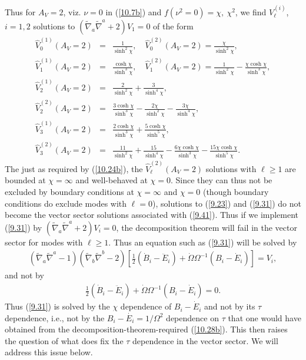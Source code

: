 Thus for $A_V=2$, viz. $\nu=0$  in (\ref{10.7b}) and $f(\nu^2=0)=\chi,~\chi^2$,  we find $V^{(i)}_{\ell}$, $i=1,2$ solutions to $(\tilde{\nabla}_a\tilde{\nabla}^a+2)V_1=0$ of the form 
%
\begin{eqnarray}
\hat{V}^{(1)}_0(A_V=2)&=&\frac{1}{ \sinh^2\chi},\quad \hat{V}^{(2)}_0(A_V=2)=\frac{\chi }{ \sinh^2\chi},
\nonumber\\
\hat{V}^{(1)}_1(A_V=2)&=&\frac{\cosh \chi }{ \sinh^3\chi},\quad \hat{V}^{(2)}_1(A_V=2)=\frac{1}{ \sinh^2\chi}-\frac{\chi\cosh\chi}{ \sinh^3\chi},
\nonumber\\
\hat{V}^{(1)}_2(A_V=2)&=&\frac{2}{ \sinh^2\chi}+\frac{3}{\sinh^4\chi},
\nonumber\\
\hat{V}^{(2)}_2(A_V=2)&=&\frac{3\cosh\chi}{\sinh^3\chi}-\frac{2\chi}{\sinh^2\chi}-\frac{3\chi }{\sinh^4\chi},
\nonumber\\
\hat{V}^{(1)}_3(A_V=2)&=&\frac{2\cosh\chi}{\sinh^3\chi}+\frac{5\cosh\chi}{\sinh^5\chi},
\nonumber\\
 \hat{V}^{(2)}_3(A_V=2)&=&\frac{11}{\sinh^2\chi}+\frac{15}{\sinh^4\chi}-\frac{6\chi\cosh\chi}{\sinh^3\chi}-\frac{15\chi\cosh\chi }{\sinh^5\chi}.~~~
\label{10.26b}
\end{eqnarray}
%
The just as required by (\ref{10.24b}), the $\hat{V}^{(2)}_{\ell}(A_V=2)$ solutions with $\ell \geq1$ are bounded at  $\chi=\infty$ and well-behaved at $\chi=0$. Since they can thus not be excluded by boundary conditions at $\chi=\infty$ and $\chi=0$ (though boundary conditions do exclude modes with $\ell=0$), solutions to (\ref{9.23}) and (\ref{9.31}) do not become the vector sector solutions associated with (\ref{9.41}). Thus if we implement (\ref{9.31}) by $(\tilde{\nabla}_a\tilde{\nabla}^a+2)V_i=0$, the  decomposition theorem will fail in the vector sector for modes with $\ell \geq 1$. Thus an equation such as (\ref{9.31}) 
will be solved by 
%
\begin{eqnarray}
(\tilde{\nabla}_a\tilde{\nabla}^a-1)(\tilde{\nabla}_b\tilde{\nabla}^b-2)\left[\tfrac{1}{2}(\dot{B}_i-\ddot{E}_i)+\dot{\Omega}\Omega^{-1}(B_i-\dot{E}_i)\right]=V_i,
\label{10.27b}
\end{eqnarray}
%
and not by
%
\begin{eqnarray}
\tfrac{1}{2}(\dot{B}_i-\ddot{E}_i)+\dot{\Omega}\Omega^{-1}(B_i-\dot{E}_i)=0.
\label{10.28b}
\end{eqnarray}
%
Thus (\ref{9.31}) is solved by the $\chi$ dependence of $B_i-\dot{E}_i$ and not by its $\tau$ dependence, i.e., not by the $B_i-\dot{E_i}=1/\Omega^2$ dependence on $\tau$ that one would have obtained from the decomposition-theorem-required (\ref{10.28b}). This then raises the question of what does fix the $\tau$ dependence in the vector sector. We will address this issue below.

